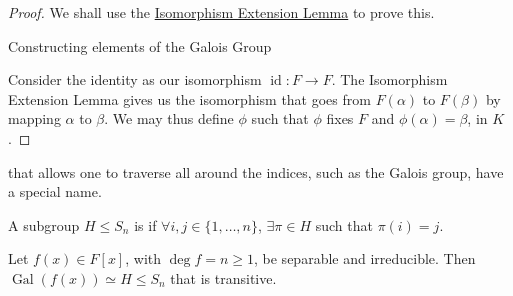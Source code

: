 \documentclass[notoc,notitlepage]{tufte-book}
\DeclareMathOperator{\Gal}{Gal}
\DeclareMathOperator{\id}{id}
\begin{document}
\begin{proof}
  We shall use the \hyperref[lemma:isomorphism_extension_lemma]{Isomorphism
  Extension Lemma} to prove this.
  \begin{marginfigure}
    \centering
    \caption{Constructing elements of the Galois Group}\label{fig:constructing_elements_of_the_galois_group}
  \end{marginfigure}
  Consider the identity as our isomorphism $\id : F \to F$. The Isomorphism
  Extension Lemma gives us the isomorphism that goes from $F(\alpha)$ to
  $F(\beta)$ by mapping $\alpha$ to $\beta$. We may thus define $\phi$ such that
  $\phi$ fixes $F$ and $\phi(\alpha) = \beta$, in $K$.
\end{proof}

 that allows one to traverse all around the
indices, such as the Galois group, have a special name.

\begin{defn}\label{defn:transitive_subgroup}
  A subgroup $H \leq S_n$ is  if $\forall i, j \in \{ 1,
  \ldots, n \}$, $\exists \pi \in H$ such that $\pi(i) = j$.
\end{defn}

\begin{crly}\label{crly:the_galois_group_of_a_separable_irreducible_polynomial_is_transitive}
  Let $f(x) \in F[x]$, with $\deg f = n \geq 1$, be separable and irreducible.
  Then $\Gal(f(x)) \simeq H \leq S_n$ that is transitive.
\end{crly}
\end{document}
